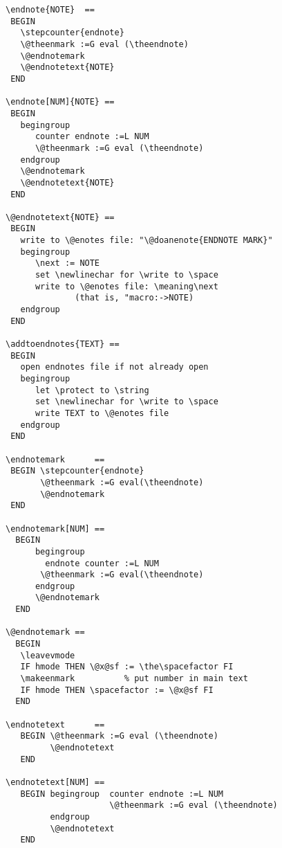 \documentclass[pagesize=auto]{scrartcl}
\begin{document}
\begin{verbatim}
\endnote{NOTE}  ==
 BEGIN
   \stepcounter{endnote}
   \@theenmark :=G eval (\theendnote)
   \@endnotemark
   \@endnotetext{NOTE}
 END

\endnote[NUM]{NOTE} ==
 BEGIN
   begingroup
      counter endnote :=L NUM
      \@theenmark :=G eval (\theendnote)
   endgroup
   \@endnotemark
   \@endnotetext{NOTE}
 END

\@endnotetext{NOTE} ==
 BEGIN
   write to \@enotes file: "\@doanenote{ENDNOTE MARK}"
   begingroup
      \next := NOTE
      set \newlinechar for \write to \space
      write to \@enotes file: \meaning\next
              (that is, "macro:->NOTE)
   endgroup
 END

\addtoendnotes{TEXT} ==
 BEGIN
   open endnotes file if not already open
   begingroup
      let \protect to \string
      set \newlinechar for \write to \space
      write TEXT to \@enotes file
   endgroup
 END

\endnotemark      ==
 BEGIN \stepcounter{endnote}
       \@theenmark :=G eval(\theendnote)
       \@endnotemark
 END

\endnotemark[NUM] ==
  BEGIN
      begingroup
        endnote counter :=L NUM
       \@theenmark :=G eval(\theendnote)
      endgroup
      \@endnotemark
  END

\@endnotemark ==
  BEGIN
   \leavevmode
   IF hmode THEN \@x@sf := \the\spacefactor FI
   \makeenmark          % put number in main text
   IF hmode THEN \spacefactor := \@x@sf FI
  END

\endnotetext      ==
   BEGIN \@theenmark :=G eval (\theendnote)
         \@endnotetext
   END

\endnotetext[NUM] ==
   BEGIN begingroup  counter endnote :=L NUM
                     \@theenmark :=G eval (\theendnote)
         endgroup
         \@endnotetext
   END
\end{verbatim}
\end{document}
